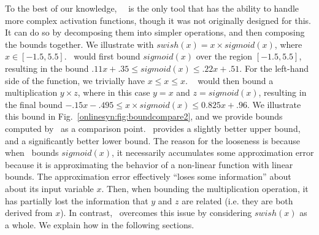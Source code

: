 
To the best of our knowledge,~\autolipra{}~\cite{autolipra} is the only tool
that has the ability to handle more complex activation functions, though it was
not originally designed for this. It
can do so by decomposing them into simpler
operations, and then composing the bounds together. We illustrate with $
swish(x) = x \times sigmoid(x) $, where $ x \in [-1.5, 5.5] $.~\autolipra{}
would first bound $ sigmoid(x) $ over the region $ [-1.5, 5.5] $, resulting in
the bound $ .11x + .35 \leq sigmoid(x) \leq .22x + .51 $.
%
For the left-hand side of the function, we
trivially have $ x \leq x \leq x $.
%
~\autolipra{} would then bound a multiplication $ y \times z $, where
in this case $ y = x $ and $ z = sigmoid(x) $, resulting in the final bound
$ -.15x - .495 \leq x\times sigmoid(x) \leq 0.825x + .96 $. We illustrate this
bound in Fig.~\ref{onlinesyn:fig:boundcompare2}, and we provide bounds computed
by~\Name{} as a comparison point.~\Name{} provides a slightly better upper
bound, and a significantly better lower bound. The reason for the looseness is
because when~\autolipra{} bounds $ sigmoid(x) $, it necessarily accumulates some
approximation error because it is approximating the behavior of a non-linear
function with linear bounds. The approximation error effectively ``loses some
information'' about about its input variable $ x $. Then, when bounding the
multiplication operation, it has partially lost the information that $ y $ and
$ z $ are related (i.e. they are both derived from $ x $).
%
In
contrast,~\Name{} overcomes this issue by considering $ swish(x) $ as a whole.
We explain how in the following sections.



